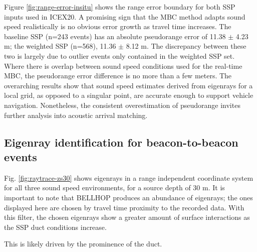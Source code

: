 Figure \ref{fig:range-error-insitu} shows the range error boundary for both SSP inputs used in ICEX20.
A promising sign that the MBC method adapts sound speed realistically is no obvious error growth as travel time increases.
The baseline SSP (n=243 events) has an absolute pseudorange error of 11.38 $\pm$ 4.23 m; the weighted SSP (n=568), 11.36 $\pm$ 8.12 m.
The discrepancy between these two is largely due to outlier events only contained in the weighted SSP set.
Where there is overlap between sound speed conditions used for the real-time MBC, the pseudorange error difference is no more than a few meters.
The overarching results show that sound speed estimates derived from eigenrays for a local grid, as opposed to a singular point, are accurate enough to support vehicle navigation.
Nonetheless, the consistent overestimation of pseudorange invites further analysis into acoustic arrival matching.

\subsection{Eigenray identification for beacon-to-beacon events}

Fig. \ref{fig:raytrace-zs30} shows eigenrays in a range independent coordinate system for all three sound speed environments, for a source depth of 30 m.
 It is important to note that BELLHOP produces an abundance of eigenrays; the ones displayed here are chosen by travel time proximity to the recorded data.
With this filter, the chosen eigenrays show a greater amount of surface interactions as the SSP duct conditions increase.

 This is likely driven by the prominence of the duct.


